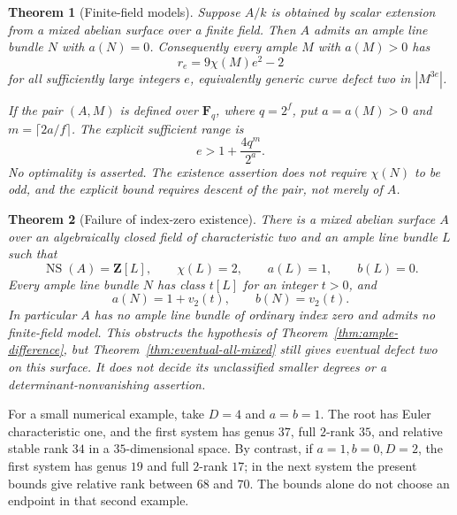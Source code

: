 \documentclass[11pt]{article}
\newtheorem{theorem}{Theorem}[section]
\theoremstyle{definition}\newtheorem{definition}[theorem]{Definition}
\theoremstyle{remark}\newtheorem{remark}[theorem]{Remark}
\newcommand{\FF}{\mathbf F}
\newcommand{\NS}{\operatorname{NS}}
\begin{document}
\begin{theorem}[Finite-field models]\label{thm:finite-field}
Suppose $A/k$ is obtained by scalar extension from a mixed abelian surface over a finite field. Then $A$ admits an ample line bundle $N$ with $a(N)=0$. Consequently every ample $M$ with $a(M)>0$ has
\[
                         r_e=9\chi(M)e^2-2
\]
for all sufficiently large integers $e$, equivalently generic curve defect two in $|M^{3e}|$.

If the pair $(A,M)$ is defined over $\FF_q$, where $q=2^f$, put $a=a(M)>0$ and $m=\lceil2a/f\rceil$. The explicit sufficient range is
\begin{equation}\label{eq:finite-threshold}
                         e>1+\frac{4q^m}{2^a}.
\end{equation}
No optimality is asserted. The existence assertion does not require $\chi(N)$ to be odd, and the explicit bound requires descent of the pair, not merely of $A$.
\end{theorem}

\begin{theorem}[Failure of index-zero existence]\label{thm:no-ordinary-index-zero-ample-class}
There is a mixed abelian surface $A$ over an algebraically closed field of characteristic two and an ample line bundle $L$ such that
\[
 \NS(A)=\mathbf Z[L],\qquad \chi(L)=2,\qquad a(L)=1,\qquad b(L)=0.
\]
Every ample line bundle $N$ has class $t[L]$ for an integer $t>0$, and
\[
                  a(N)=1+v_2(t),\qquad b(N)=v_2(t).
\]
In particular $A$ has no ample line bundle of ordinary index zero and admits no finite-field model. This obstructs the hypothesis of Theorem~\ref{thm:ample-difference}, but Theorem~\ref{thm:eventual-all-mixed} still gives eventual defect two on this surface. It does not decide its unclassified smaller degrees or a determinant-nonvanishing assertion.
\end{theorem}

For a small numerical example, take $D=4$ and $a=b=1$. The root has Euler characteristic one, and the first system has genus $37$, full $2$-rank $35$, and relative stable rank $34$ in a $35$-dimensional space. By contrast, if $a=1,b=0,D=2$, the first system has genus $19$ and full $2$-rank $17$; in the next system the present bounds give relative rank between $68$ and $70$. The bounds alone do not choose an endpoint in that second example.
\end{document}
